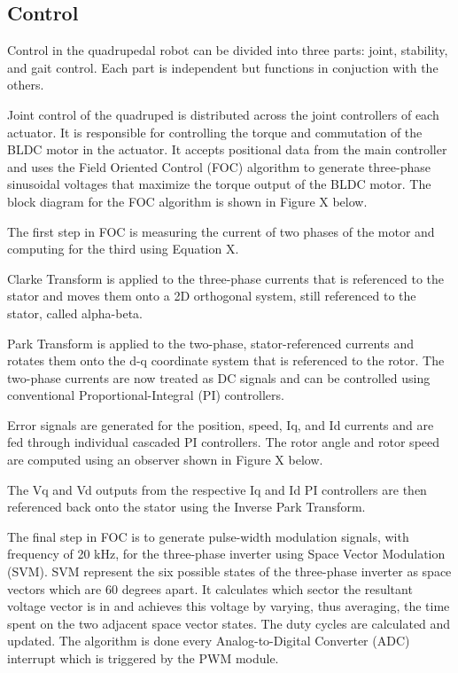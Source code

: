 \documentclass[english]{upeeei}
\begin{document}
\subsection{Control}

Control in the quadrupedal robot can be divided into three parts: joint, stability, and gait control. Each part is independent but functions in conjuction with the others.

Joint control of the quadruped is distributed across the joint controllers of each actuator. It is responsible for controlling the torque and commutation of the BLDC motor in the actuator. It accepts positional data from the main controller and uses the Field Oriented Control (FOC) algorithm to generate three-phase sinusoidal voltages that maximize the torque output of the BLDC motor. The block diagram for the FOC algorithm is shown in Figure X below.

The first step in FOC is measuring the current of two phases of the motor and computing for the third using Equation X. 

Clarke Transform is applied to the three-phase currents that is referenced to the stator and moves them onto a 2D orthogonal system, still referenced to the stator, called alpha-beta.

Park Transform is applied to the two-phase, stator-referenced currents and rotates them onto the d-q coordinate system that is referenced to the rotor. The two-phase currents are now treated as DC signals and can be controlled using conventional Proportional-Integral (PI) controllers. 

Error signals are generated for the position, speed, Iq, and Id currents and are fed through individual cascaded PI controllers. The rotor angle and rotor speed are computed using an observer shown in Figure X below. 

The Vq and Vd outputs from the respective Iq and Id PI controllers are then referenced back onto the stator using the Inverse Park Transform. 

The final step in FOC is to generate pulse-width modulation signals, with frequency of 20 kHz, for the three-phase inverter using Space Vector Modulation (SVM). SVM represent the six possible states of the three-phase inverter as space vectors which are 60 degrees apart. It calculates which sector the resultant voltage vector is in and achieves this voltage by varying, thus averaging, the time spent on the two adjacent space vector states. The duty cycles are calculated and updated. The algorithm is done every Analog-to-Digital Converter (ADC) interrupt which is triggered by the PWM module.
\end{document}
